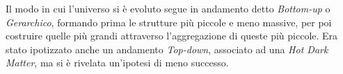 Il modo in cui l'universo si è evoluto segue in andamento detto \textit{Bottom-up} o \textit{Gerarchico}, formando prima le strutture più piccole e meno massive, per poi costruire quelle più grandi attraverso l'aggregazione di queste più piccole. Era stato ipotizzato anche un andamento \textit{Top-down}, associato ad una \textit{Hot Dark Matter}, ma si è rivelata un'ipotesi di meno successo.